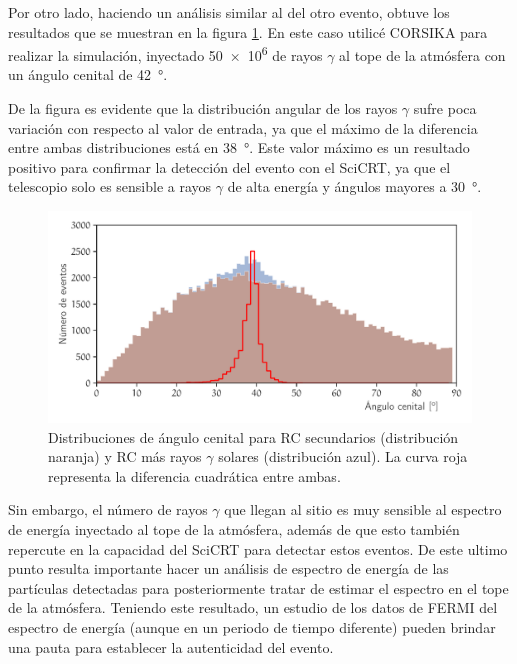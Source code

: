 Por otro lado, haciendo un análisis similar al del otro evento, obtuve los resultados que se muestran en la figura \ref{fig:sg-angular}. En este caso utilicé CORSIKA para realizar la simulación, inyectado \num{50e6} de rayos $\gamma$ al tope de la atmósfera con un ángulo cenital de \SI{42}{\degree}.

De la figura es evidente que la distribución angular de los rayos $\gamma$ sufre poca variación con respecto al valor de entrada, ya que el máximo de la diferencia entre ambas distribuciones está en \SI{38}{\degree}. Este valor máximo es un resultado positivo para confirmar la detección del evento con el SciCRT, ya que el telescopio solo es sensible a rayos $\gamma$ de alta energía y ángulos mayores a \SI{30}{\degree}.

\begin{figure}
        \centering
        \includegraphics[width=\textwidth]{solar-gammas-angular.pdf}
        \caption{Distribuciones de ángulo cenital para RC secundarios (distribución naranja) y RC más rayos $\gamma$ solares (distribución azul). La curva roja representa la diferencia cuadrática entre ambas.}
        \label{fig:sg-angular}
\end{figure}

Sin embargo, el número de rayos $\gamma$ que llegan al sitio es muy sensible al espectro de energía inyectado al tope de la atmósfera, además de que esto también repercute en la capacidad del SciCRT para detectar estos eventos. De este ultimo punto resulta importante hacer un análisis de espectro de energía de las partículas detectadas para posteriormente tratar de estimar el espectro en el tope de la atmósfera. Teniendo este resultado, un estudio de los datos de FERMI del espectro de energía (aunque en un periodo de tiempo diferente) pueden brindar una pauta para establecer la autenticidad del evento.
